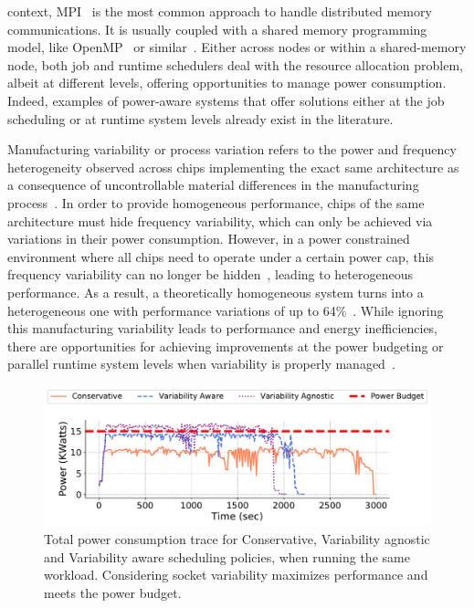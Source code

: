 context, MPI~\cite{Nagle:2005:MCR:1239662.1239666} is the most common approach to handle
distributed memory communications.  It is usually coupled with a shared memory programming
model, like OpenMP~\cite{openmp13} or similar~\cite{10.1007/978-3-540-85261-2_5}.
Either across nodes or within a shared-memory node, both job and runtime schedulers deal
with the resource allocation problem, albeit at different levels, offering opportunities
to manage power consumption.  Indeed, examples of power-aware systems  that offer
solutions either at the job scheduling
\cite{Gholkar:2016:PTH:2967938.2967961,7515666,Ellsworth:2015:DPS:2807591.2807643,Etinski2012615}
or at runtime system  \cite{Gholkar:2016:PTH:2967938.2967961,
Chasapis:2016:RMM:2925426.2926279,Totoni:tech:2014,Teodorescu:2008:VAS:1381306.1382152,Inadomi:2015:AMI:2807591.2807638}
levels already exist in the literature.
\par
Manufacturing variability or process variation refers to the power and frequency
heterogeneity observed across chips implementing the exact same architecture as a
consequence of uncontrollable material differences in the manufacturing
process~\cite{Rountree:2012:BDF:2357488.2357648}.  In order to provide homogeneous
performance, chips of the same architecture must hide frequency variability, which can
only be achieved via variations in their power consumption.  However, in a power
constrained environment where all chips need to operate under a certain power cap, this
frequency variability can no longer be hidden~\cite{Rountree:2012:BDF:2357488.2357648},
leading to heterogeneous performance.  As a result, a theoretically homogeneous system
turns into a heterogeneous one with performance variations of up to
64\%~\cite{Inadomi:2015:AMI:2807591.2807638}.  While ignoring this manufacturing
variability leads to performance and energy inefficiencies, there are opportunities for
achieving improvements at the power budgeting or parallel runtime system levels when
variability is properly
managed~\cite{Chasapis:2016:RMM:2925426.2926279,Teodorescu:2008:VAS:1381306.1382152,Inadomi:2015:AMI:2807591.2807638,Gholkar:2016:PTH:2967938.2967961,Totoni:tech:2014}.

\begin{figure}
	\centering
	\includegraphics[width=\columnwidth]{power_aware_job_scheduling/figures/motivation}
	\caption{Total power consumption trace for Conservative, Variability agnostic and 
		Variability aware scheduling policies, when running the same workload.  
		Considering socket variability maximizes performance 
		and meets the power budget.}
	\label{fig:motivation}
\end{figure}


